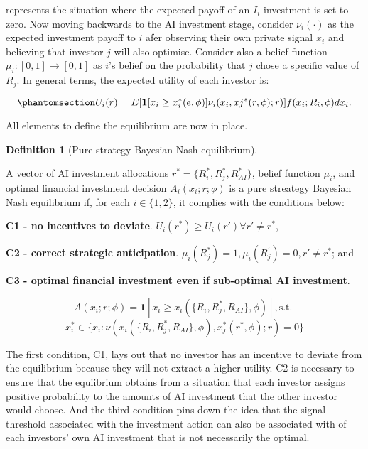 \documentclass[
]{article}
\theoremstyle{definition}
\newtheorem{definition}{Definition}[section]
\theoremstyle{plain}
\theoremstyle{remark}
\begin{document}
represents the situation where the expected payoff of an \(I_i\)
investment is set to zero. Now moving backwards to the AI investment
stage, consider \(\nu_i(\cdot)\) as the expected investment payoff to
\(i\) afer observing their own private signal \(x_i\) and believing that
investor \(j\) will also optimise. Consider also a belief function
\(\mu_i : [0, 1] \to [0, 1]\) as \(i\)'s belief on the probability that
\(j\) chose a specific value of \(R_j\). In general terms, the expected
utility of each investor is:

\begin{equation}\phantomsection\label{eq-expectedutil}{
U_i(r) = E[\mathbf{1}[x_i \geq x_i^*(e, \phi)] \nu_i(x_i, xj^*(r, \phi); r)]f(x_i;R_i, \phi)dx_i.
}\end{equation}

All elements to define the equilibrium are now in place.

\begin{definition}[Pure strategy Bayesian Nash
equilibrium]\protect\hypertarget{def-equilibrium}{}\label{def-equilibrium}

A vector of AI investment allocations
\(r^* = \{R_i^*, R_j^*, R_{AI}^*\}\), belief function \(\mu_i\), and
optimal financial investment decision \(A_i(x_i;r;\phi)\) is a pure
streategy Bayesian Nash equilibrium if, for each \(i \in \{1,2\}\), it
complies with the conditions below:

\textbf{C1 - no incentives to deviate}.
\(U_i(r^*) \geq U_i(r') \forall r' \neq r^*\),

\textbf{C2 - correct strategic anticipation}.
\(\mu_i(R_j^*)=1, \mu_i(R_j^{'}) = 0, r' \neq r^*\); and

\textbf{C3 - optimal financial investment even if sub-optimal AI
investment}.

\[
A(x_i;r;\phi) = \mathbf{1}[x_i \geq x_i(\{R_i, R_j^*, R_{AI}\}, \phi)], \text{s.t.  }
\] \[
x_i^* \in \{x_i : \nu(x_i(\{R_i, R_j^*, R_{AI}\}, \phi), x_j^*(r^*, \phi); r) = 0 \}
\]

\end{definition}

The first condition, C1, lays out that no investor has an incentive to
deviate from the equilibrium because they will not extract a higher
utility. C2 is necessary to ensure that the equiibrium obtains from a
situation that each investor assigns positive probability to the amounts
of AI investment that the other investor would choose. And the third
condition pins down the idea that the signal threshold associated with
the investment action can also be associated with of each investors' own
AI investment that is not necessarily the optimal.
\end{document}
